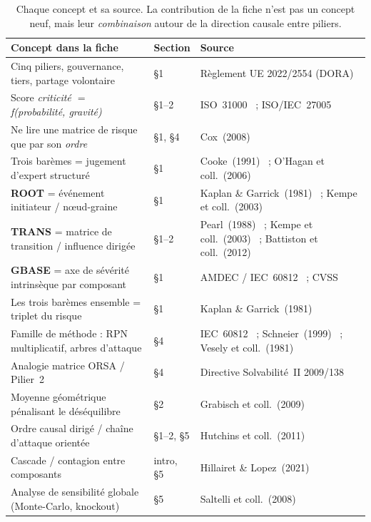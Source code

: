 \documentclass[11pt,a4paper]{article}
\begin{document}
\begin{table}[h]\centering\small
\renewcommand{\arraystretch}{1.3}
\begin{tabular}{@{}p{6.3cm} p{1.6cm} p{6.2cm}@{}}
\toprule
\textbf{Concept dans la fiche} & \textbf{Section} & \textbf{Source} \\
\midrule
Cinq piliers, gouvernance, tiers, partage volontaire & \S1 & Règlement UE 2022/2554 (DORA)~\cite{DORA2022} \\
Score \emph{criticité $=$ f(probabilité, gravité)} & \S1--2 & ISO~31000~\cite{ISO31000} ; ISO/IEC~27005~\cite{ISO27005} \\
Ne lire une matrice de risque que par son \emph{ordre} & \S1, \S4 & Cox~(2008)~\cite{Cox2008} \\
Trois barèmes = jugement d'expert structuré & \S1 & Cooke~(1991)~\cite{Cooke1991} ; O'Hagan et coll.~(2006)~\cite{OHagan2006} \\
\textbf{ROOT} = événement initiateur / n\oe{}ud-graine & \S1 & Kaplan \& Garrick~(1981)~\cite{KaplanGarrick1981} ; Kempe et coll.~(2003)~\cite{Kempe2003} \\
\textbf{TRANS} = matrice de transition / influence dirigée & \S1--2 & Pearl~(1988)~\cite{Pearl1988} ; Kempe et coll.~(2003)~\cite{Kempe2003} ; Battiston et coll.~(2012)~\cite{Battiston2012} \\
\textbf{GBASE} = axe de sévérité intrinsèque par composant & \S1 & AMDEC / IEC~60812~\cite{IEC60812} ; CVSS~\cite{CVSS} \\
Les trois barèmes ensemble = triplet du risque & \S1 & Kaplan \& Garrick~(1981)~\cite{KaplanGarrick1981} \\
Famille de méthode : RPN multiplicatif, arbres d'attaque & \S4 & IEC~60812~\cite{IEC60812} ; Schneier~(1999)~\cite{Schneier1999} ; Vesely et coll.~(1981)~\cite{Vesely1981} \\
Analogie matrice ORSA / Pilier~2 & \S4 & Directive Solvabilité~II 2009/138~\cite{SolvencyII2009} \\
Moyenne géométrique pénalisant le déséquilibre & \S2 & Grabisch et coll.~(2009)~\cite{Grabisch2009} \\
Ordre causal dirigé / chaîne d'attaque orientée & \S1--2, \S5 & Hutchins et coll.~(2011)~\cite{Hutchins2011} \\
Cascade / contagion entre composants & intro, \S5 & Hillairet \& Lopez~(2021)~\cite{HillairetLopez2021} \\
Analyse de sensibilité globale (Monte-Carlo, knockout) & \S5 & Saltelli et coll.~(2008)~\cite{Saltelli2008} \\
\bottomrule
\end{tabular}
\caption{Chaque concept et sa source. La contribution de la fiche n'est pas un concept neuf,
mais leur \emph{combinaison} autour de la direction causale entre piliers.}
\end{table}
\end{document}
